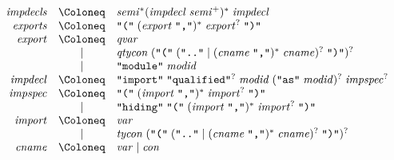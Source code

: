 \begin{align*}
  \begin{array}{rcl}
    \mathit{impdecls}
    & \Coloneq & \mathit{semi}^* (\mathit{impdecl}\; \mathit{semi}^+)^*\; \mathit{impdecl}
    \\
    \mathit{exports}
    & \Coloneq & \text{\texttt{\textquotedbl(\textquotedbl}}\; (\mathit{export}\; \text{\texttt{\textquotedbl,\textquotedbl}})^*\; \mathit{export}^?\; \text{\texttt{\textquotedbl)\textquotedbl}} \\
    \mathit{export}
    & \Coloneq & \mathit{qvar} \\
    & \mid & \mathit{qtycon}\; (\text{\texttt{\textquotedbl(\textquotedbl}}\; (\text{\texttt{\textquotedbl..\textquotedbl}} \mid (\mathit{cname}\; \text{\texttt{\textquotedbl,\textquotedbl}})^*\; \mathit{cname})^?\; \text{\texttt{\textquotedbl)\textquotedbl}})^? \\
    & \mid & \text{\texttt{\textquotedbl module\textquotedbl}}\; \mathit{modid} \\
    \mathit{impdecl}
    & \Coloneq & \text{\texttt{\textquotedbl import\textquotedbl}}\; \text{\texttt{\textquotedbl qualified\textquotedbl}}^?\; \mathit{modid}\; (\text{\texttt{\textquotedbl as\textquotedbl}}\; \mathit{modid})^?\; \mathit{impspec}^? \\
    \mathit{impspec}
    & \Coloneq & \text{\texttt{\textquotedbl(\textquotedbl}}\; (\mathit{import}\; \text{\texttt{\textquotedbl,\textquotedbl}})^*\; \mathit{import}^?\; \text{\texttt{\textquotedbl)\textquotedbl}} \\
    & \mid & \text{\texttt{\textquotedbl hiding\textquotedbl}}\;\text{\texttt{\textquotedbl(\textquotedbl}}\; (\mathit{import}\; \text{\texttt{\textquotedbl,\textquotedbl}})^*\; \mathit{import}^?\; \text{\texttt{\textquotedbl)\textquotedbl}} \\
    \mathit{import}
    & \Coloneq & \mathit{var} \\
    & \mid & \mathit{tycon}\; (\text{\texttt{\textquotedbl(\textquotedbl}}\; (\text{\texttt{\textquotedbl..\textquotedbl}} \mid (\mathit{cname}\; \text{\texttt{\textquotedbl,\textquotedbl}})^*\; \mathit{cname})^?\; \text{\texttt{\textquotedbl)\textquotedbl}})^? \\
    \mathit{cname}
    & \Coloneq & \mathit{var} \mid \mathit{con}
  \end{array}
\end{align*}

